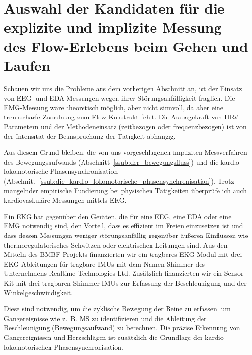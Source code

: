 

\section{Auswahl der Kandidaten für die explizite und implizite Messung des Flow-Erlebens beim Gehen und Laufen} 

\label{sec:auswahl_der_kandidaten_fur_die_explizite_und_implizite_messung_des_flow_erlebens_beim_gehen_und_laufen}

Schauen wir uns die Probleme aus dem vorherigen Abschnitt an, ist der Einsatz von \ac{EEG}- und \ac{EDA}-Messungen wegen ihrer Störungsanfälligkeit fraglich. Die \ac{EMG}-Messung wäre theoretisch möglich, aber nicht sinnvoll, da aber eine trennscharfe Zuordnung zum Flow-Konstrukt fehlt. Die Aussagekraft von \ac{HRV}-Parametern und der Methodeneinsatz (zeitbezogen oder frequenzbezogen) ist von der Intensität der Beanspruchung der Tätigkeit abhängig.

Aus diesem Grund bleiben, die von uns vorgeschlagenen impliziten Messverfahren des Bewegungsaufwands (Abschnitt~\ref{ssub:der_bewegungsfluss}) und die kardio-lokomotorische Phasensynchronisation (Abschnitt~\ref{ssub:die_kardio_lokomotorische_phasensynchronisation}). Trotz mangelnder empirische Fundierung bei physischen Tätigkeiten überprüfe ich auch kardiovaskuläre Messungen mittels \ac{EKG}. 

Ein \ac{EKG} hat gegenüber den Geräten, die für eine \ac{EEG}, eine \ac{EDA} oder eine \ac{EMG} notwendig sind, den Vorteil, dass es effizient im Freien einzusetzen ist und dass dessen Messungen weniger störungsanfällig gegenüber äußeren Einflüssen wie thermoregulatorisches Schwitzen oder elektrischen Leitungen sind. Aus den Mitteln des \acs{BMBF}-Projekts finanzierten wir ein tragbares \ac{EKG}-Modul mit drei \ac{EKG}-Ableitungen für tragbare \acp{IMU} mit dem Namen Shimmer des Unternehmens Realtime Technologies Ltd. Zusätzlich finanzierten wir ein Sensor-Kit mit drei tragbaren Shimmer \acp{IMU} zur Erfassung der Beschleunigung und der Winkelgeschwindigkeit.

Diese sind notwendig, um die zyklische Bewegung der Beine zu erfassen, um Gangereignisse wie z.~B. \ac{MS} zu identifizieren und die Ableitung der Beschleunigung (Bewegungsaufwand) zu berechnen. Die präzise Erkennung von Gangereignissen und Herzschlägen ist zusätzlich die Grundlage der kardio-lokomotorischen Phasensynchronisation. 

